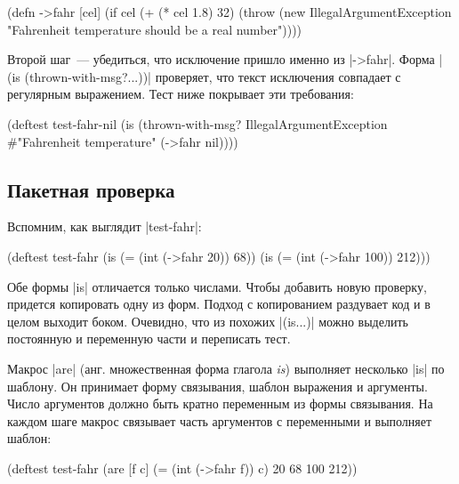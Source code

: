 \begin{english}
  \begin{clojure}
(defn ->fahr [cel]
  (if cel
    (+ (* cel 1.8) 32)
    (throw (new IllegalArgumentException
            "Fahrenheit temperature should be a real number"))))
  \end{clojure}
\end{english}

Второй шаг~--- убедиться, что исключение пришло именно из \spverb|->fahr|. Форма
\spverb|(is (thrown-with-msg?...))| проверяет, что текст исключения совпадает с
регулярным выражением. Тест ниже покрывает эти требования:

\begin{english}
  \begin{clojure}
(deftest test-fahr-nil
  (is (thrown-with-msg?
       IllegalArgumentException #"Fahrenheit temperature"
       (->fahr nil))))
  \end{clojure}
\end{english}

\subsection{Пакетная проверка}

Вспомним, как выглядит \spverb|test-fahr|:

\begin{english}
  \begin{clojure}
(deftest test-fahr
  (is (= (int (->fahr 20)) 68))
  (is (= (int (->fahr 100)) 212)))
  \end{clojure}
\end{english}

Обе формы \spverb|is| отличается только числами. Чтобы добавить новую проверку,
придется копировать одну из форм. Подход с копированием раздувает код и в целом
выходит боком. Очевидно, что из похожих \spverb|(is...)| можно выделить
постоянную и переменную части и переписать тест.

Макрос \spverb|are| (анг. множественная форма глагола \emph{is}) выполняет
несколько \spverb|is| по шаблону. Он принимает форму связывания, шаблон
выражения и аргументы. Число аргументов должно быть кратно переменным из формы
связывания. На каждом шаге макрос связывает часть аргументов с переменными и
выполняет шаблон:

\begin{english}
  \begin{clojure}
(deftest test-fahr
  (are [f c] (= (int (->fahr f)) c)
    20 68
    100 212))
  \end{clojure}
\end{english}

